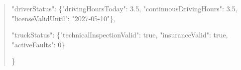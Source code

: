 \begin{quote}
    "\allowbreak{}d\allowbreak{}r\allowbreak{}i\allowbreak{}v\allowbreak{}e\allowbreak{}r\allowbreak{}S\allowbreak{}t\allowbreak{}a\allowbreak{}t\allowbreak{}u\allowbreak{}s\allowbreak{}"\allowbreak{}:\allowbreak{} \{\allowbreak{}"\allowbreak{}d\allowbreak{}r\allowbreak{}i\allowbreak{}v\allowbreak{}i\allowbreak{}n\allowbreak{}g\allowbreak{}H\allowbreak{}o\allowbreak{}u\allowbreak{}r\allowbreak{}s\allowbreak{}T\allowbreak{}o\allowbreak{}d\allowbreak{}a\allowbreak{}y\allowbreak{}"\allowbreak{}:\allowbreak{} 3\allowbreak{}.\allowbreak{}5\allowbreak{},\allowbreak{} "\allowbreak{}c\allowbreak{}o\allowbreak{}n\allowbreak{}t\allowbreak{}i\allowbreak{}n\allowbreak{}u\allowbreak{}o\allowbreak{}u\allowbreak{}s\allowbreak{}D\allowbreak{}r\allowbreak{}i\allowbreak{}v\allowbreak{}i\allowbreak{}n\allowbreak{}g\allowbreak{}H\allowbreak{}o\allowbreak{}u\allowbreak{}r\allowbreak{}s\allowbreak{}"\allowbreak{}:\allowbreak{} 3\allowbreak{}.\allowbreak{}5\allowbreak{},\allowbreak{} "\allowbreak{}l\allowbreak{}i\allowbreak{}c\allowbreak{}e\allowbreak{}n\allowbreak{}s\allowbreak{}e\allowbreak{}V\allowbreak{}a\allowbreak{}l\allowbreak{}i\allowbreak{}d\allowbreak{}U\allowbreak{}n\allowbreak{}t\allowbreak{}i\allowbreak{}l\allowbreak{}"\allowbreak{}:\allowbreak{} "\allowbreak{}2\allowbreak{}0\allowbreak{}2\allowbreak{}7\allowbreak{}-\allowbreak{}0\allowbreak{}5\allowbreak{}-\allowbreak{}1\allowbreak{}0\allowbreak{}"\allowbreak{}\}\allowbreak{},\allowbreak{}\par
    "\allowbreak{}t\allowbreak{}r\allowbreak{}u\allowbreak{}c\allowbreak{}k\allowbreak{}S\allowbreak{}t\allowbreak{}a\allowbreak{}t\allowbreak{}u\allowbreak{}s\allowbreak{}"\allowbreak{}:\allowbreak{} \{\allowbreak{}"\allowbreak{}t\allowbreak{}e\allowbreak{}c\allowbreak{}h\allowbreak{}n\allowbreak{}i\allowbreak{}c\allowbreak{}a\allowbreak{}l\allowbreak{}I\allowbreak{}n\allowbreak{}s\allowbreak{}p\allowbreak{}e\allowbreak{}c\allowbreak{}t\allowbreak{}i\allowbreak{}o\allowbreak{}n\allowbreak{}V\allowbreak{}a\allowbreak{}l\allowbreak{}i\allowbreak{}d\allowbreak{}"\allowbreak{}:\allowbreak{} t\allowbreak{}r\allowbreak{}u\allowbreak{}e\allowbreak{},\allowbreak{} "\allowbreak{}i\allowbreak{}n\allowbreak{}s\allowbreak{}u\allowbreak{}r\allowbreak{}a\allowbreak{}n\allowbreak{}c\allowbreak{}e\allowbreak{}V\allowbreak{}a\allowbreak{}l\allowbreak{}i\allowbreak{}d\allowbreak{}"\allowbreak{}:\allowbreak{} t\allowbreak{}r\allowbreak{}u\allowbreak{}e\allowbreak{},\allowbreak{} "\allowbreak{}a\allowbreak{}c\allowbreak{}t\allowbreak{}i\allowbreak{}v\allowbreak{}e\allowbreak{}F\allowbreak{}a\allowbreak{}u\allowbreak{}l\allowbreak{}t\allowbreak{}s\allowbreak{}"\allowbreak{}:\allowbreak{} 0\allowbreak{}\}\allowbreak{}\par
  \}\allowbreak{}\par
\end{quote}
